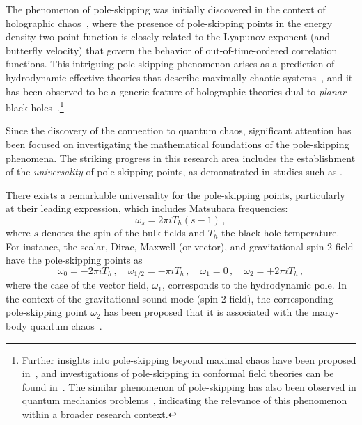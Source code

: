 \documentclass[11pt,a4paper]{article}
\begin{document}
The phenomenon of pole-skipping was initially discovered in the context of holographic chaos~\cite{Grozdanov:2017ajz,Blake:2018leo}, where the presence of pole-skipping points in the energy density two-point function is closely related to the Lyapunov exponent (and butterfly velocity) that govern the behavior of out-of-time-ordered correlation functions. This intriguing pole-skipping phenomenon arises as a prediction of hydrodynamic effective theories that describe maximally chaotic systems~\cite{Blake:2017ris,Blake:2021wqj}, and it has been observed to be a generic feature of holographic theories dual to \textit{planar} black holes~\cite{Blake:2018leo,Jeong:2021zhz}.\footnote{Further insights into pole-skipping beyond maximal chaos have been proposed in~\cite{Choi:2020tdj}, and investigations of pole-skipping in conformal field theories can be found in~\cite{Haehl:2018izb,Jensen:2019cmr,Das:2019tga,Haehl:2019eae,Ramirez:2020qer}.
The similar phenomenon of pole-skipping has also been observed in quantum mechanics problems~\cite{Natsuume:2021fhn}, indicating the relevance of this phenomenon within a broader research context.}

Since the discovery of the connection to quantum chaos, significant attention has been focused on investigating the mathematical foundations of the pole-skipping phenomena. The striking progress in this research area includes the establishment of the \textit{universality} of pole-skipping points, as demonstrated in studies such as \cite{Grozdanov:2019uhi,Blake:2019otz,Natsuume:2019xcy,Natsuume:2019sfp,Natsuume:2019vcv,Wu:2019esr,Ceplak:2019ymw,Ahn:2019rnq,Ahn:2020bks,Abbasi:2020ykq,Liu:2020yaf,Ramirez:2020qer,Ahn:2020baf,Natsuume:2020snz,Kim:2020url,Sil:2020jhr,Ceplak:2021efc,Kim:2021hqy,Jeong:2021zhz,Natsuume:2021fhn,Blake:2021hjj,Kim:2021xdz,Jeong:2022luo,Wang:2022xoc,Wang:2022mcq,Amano:2022mlu,Yuan:2023tft,Baishya:2023nsb,Grozdanov:2023txs,Natsuume:2023lzy}.

There exists a remarkable universality for the pole-skipping points, particularly at their leading expression, which includes Matsubara frequencies:
%
\begin{equation} \label{UNFOR1}
    \omega_{s}=2\pi i T_h \left( s-1 \right)\,,
\end{equation}
%
where $s$ denotes the spin of the bulk fields and $T_h$ the black hole temperature. For instance, the scalar, Dirac, Maxwell (or vector), and gravitational spin-2 field have the pole-skipping points as
%
\begin{equation} \label{}
    \omega_{0} = -2\pi i T_h \,, \quad  \omega_{1/2} = -\pi i T_h \,, \quad  \omega_{1} = 0 \,, \quad \omega_2 = + 2 \pi i T_h\,,
\end{equation}
%
where the case of the vector field, $\omega_{1}$, corresponds to the hydrodynamic pole.
%
In the context of the gravitational sound mode (spin-2 field), the corresponding pole-skipping point $\omega_2$ has been proposed that it is associated with the many-body quantum chaos~\cite{Shenker:2013pqa,Roberts:2014isa,Roberts:2014ifa,Shenker:2014cwa,Maldacena:2015waa}.\\
\end{document}
